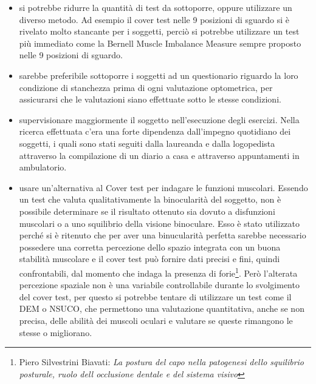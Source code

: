 \begin{itemize}
\item si potrebbe ridurre la quantità di test da sottoporre, oppure utilizzare un diverso metodo. Ad esempio il cover test nelle 9 posizioni di sguardo si è rivelato molto stancante per i soggetti, perciò si potrebbe utilizzare un test più immediato come la Bernell Muscle Imbalance Measure sempre proposto nelle 9 posizioni di sguardo.
\item sarebbe preferibile sottoporre i soggetti ad un questionario riguardo la loro condizione di stanchezza prima di ogni valutazione optometrica, per assicurarsi che le valutazioni siano effettuate sotto le stesse condizioni.
\item supervisionare maggiormente il soggetto nell’esecuzione degli esercizi. Nella ricerca effettuata c’era una forte dipendenza dall’impegno quotidiano dei soggetti, i quali sono stati seguiti dalla laureanda e dalla logopedista attraverso la compilazione di un diario a casa e attraverso appuntamenti in ambulatorio.
\item usare un’alternativa al Cover test per indagare le funzioni muscolari. Essendo un test che valuta qualitativamente la binocularità del soggetto, non è possibile determinare se il risultato ottenuto sia dovuto a disfunzioni muscolari o a uno squilibrio della visione binoculare. Esso è stato utilizzato perché si è ritenuto che per aver una binucularità perfetta sarebbe necessario possedere una corretta percezione dello spazio integrata con un buona stabilità muscolare e il cover test può fornire dati precisi e fini, quindi confrontabili, dal momento che indaga la presenza di forie\footnote{Piero Silvestrini Biavati: \emph{La postura del capo nella patogenesi dello squilibrio posturale, ruolo dell occlusione dentale e del sistema visivo}}. Però l’alterata percezione spaziale non è una variabile controllabile durante lo svolgimento del cover test, per questo si potrebbe tentare di utilizzare un test come il DEM o NSUCO, che permettono una valutazione quantitativa, anche se non precisa, delle abilità dei muscoli oculari e valutare se queste rimangono le stesse o migliorano.
\end{itemize}

